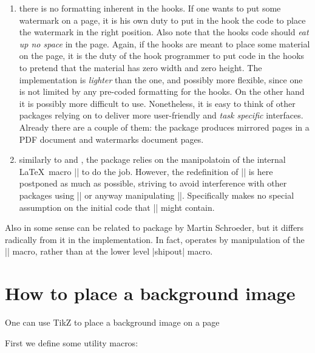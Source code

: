 \begin{teX}
 \begin{enumerate}
 \item there is no formatting inherent in the hooks. If one wants to
   put some watermark on a page, it is his own duty to put in the
   hook the code to place the watermark in the right position. Also
   note that the hooks code should \emph{eat up no space} in the
   page.  Again, if the hooks are meant to place some material on the
   page, it is the duty of the hook programmer to put code in the
   hooks to pretend that the material has zero width and zero height.
   The implementation is \emph{lighter} than the  one,
   and possibly more flexible, since one is not limited by any
   pre-coded formatting for the hooks. On the other hand it is
   possibly more difficult to use. Nonetheless, it is easy to think
   of other packages relying on  to deliver more
   user-friendly and \emph{task specific} interfaces. Already there
   are a couple of them: the package  produces
   mirrored pages in a PDF document and 
   watermarks document pages.
 \item similarly to  and , the
   package relies on the manipolatoin of the internal \LaTeX\ macro
   |\@begindvi| to do the job. However, the redefinition of
   |\@begindvi| is here postponed as much as possible, striving to
   avoid interference with other packages using |\AtBeginDvi| or
   anyway manipulating |\@begindvi|. Specifically 
   makes no special assumption on the initial code that |\@begindvi|
   might contain.
 \end{enumerate}



Also in some sense  can be related to package
  by Martin Schroeder, but it differs radically from
 it in the implementation. In fact, operates by
 manipulation of the |\@begindvi| macro, rather than at the
 lower level |shipout| macro.


\section{How to place a background image}

One can use TikZ to place a background image on a page

First we define some utility macros:


\begin{teXXX}
  \def\bg@contents{Draft}
  \def\bg@color{red!45}
  \def\bg@angle{60}
  \def\bg@opacity{.5}
  \def\bg@scale{15}
  \def\bg@position{current page.center}
  \def\bg@anchor{}
  \def\bg@hshift{0}
  \def\bg@vshift{0}
\end{teXXX}


\end{teX}
